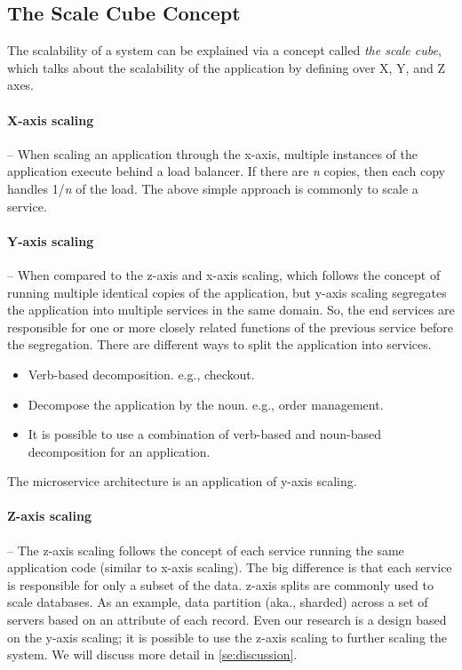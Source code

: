 \subsection{The Scale Cube Concept}
\label{subse:scale_cube}

The scalability of a system can be explained via a concept called \emph{the scale cube}, which talks about the scalability of the application by defining over X, Y, and Z axes.

\paragraph{X-axis scaling} -- When scaling an application through the x-axis, multiple instances of the application execute behind a load balancer. If there are \textit{n} copies, then each copy handles 1/\textit{n} of the load. The above simple approach is commonly to scale a service.

\paragraph{Y-axis scaling} -- When compared to the z-axis and x-axis scaling, which follows the concept of running multiple identical copies of the application, but y-axis scaling segregates the application into multiple services in the same domain. So, the end services are responsible for one or more closely related functions of the previous service before the segregation. There are different ways to split the application into services.
\begin{itemize}
    \item Verb-based decomposition. e.g., checkout.
    \item Decompose the application by the noun. e.g., order management.
    \item It is possible to use a combination of verb-based and noun-based decomposition for an application.
\end{itemize}
The microservice architecture is an application of y-axis scaling.

\paragraph{Z-axis scaling} -- The z-axis scaling follows the concept of each service running the same application code (similar to x-axis scaling). The big difference is that each service is responsible for only a subset of the data. z-axis splits are commonly used to scale databases. As an example, data partition (aka., sharded) across a set of servers based on an attribute of each record.
Even our research is a design based on the y-axis scaling; it is possible to use the z-axis scaling to further scaling the system. We will discuss more detail in \cref{se:discussion}.


